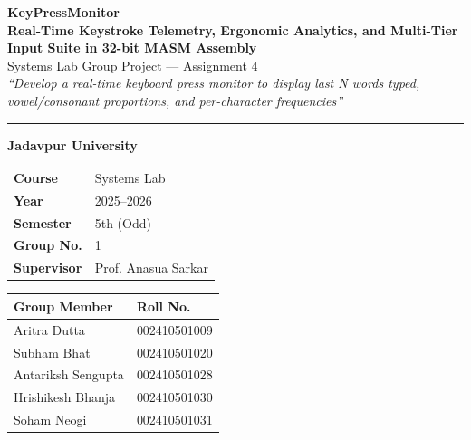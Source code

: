 \documentclass[11pt,a4paper]{article}
\begin{document}

\begin{center}
  {\Huge\textbf{\color{navyBlue}KeyPressMonitor}}\\[0.25em]
  {\Large\textbf{Real-Time Keystroke Telemetry, Ergonomic Analytics, and Multi-Tier Input Suite in 32-bit MASM Assembly}}\\[0.8em]
  {\large Systems Lab Group Project — Assignment 4}\\[0.3em]
  {\small\textit{“Develop a real-time keyboard press monitor to display last N words typed, vowel/consonant proportions, and per-character frequencies”}}
\end{center}

\vspace{0.8em}
\noindent\rule{\textwidth}{1.2pt}
\vspace{0.8em}

\noindent
\begin{minipage}[t]{0.48\textwidth}
  \begin{tcolorbox}[labbox, title=Dept. of Computer Science \& Engineering, colbacktitle=navyBlue]
    \textbf{Jadavpur University}\\[0.5em]
    \begin{tabular}{ll}
      \textbf{Course}     & Systems Lab \\
      \textbf{Year}       & 2025–2026 \\
      \textbf{Semester}   & 5th (Odd) \\
      \textbf{Group No.}  & 1 \\
      \textbf{Supervisor} & Prof. Anasua Sarkar
    \end{tabular}
  \end{tcolorbox}
\end{minipage}
\hfill
\begin{minipage}[t]{0.48\textwidth}
  \begin{tcolorbox}[labbox, title=Group Members \& Roll Numbers, colbacktitle=navyBlue]
    \centering
    \begin{tabular}{ll}
      \toprule
      \textbf{Group Member} & \textbf{Roll No.} \\
      \midrule
      Aritra Dutta       & 002410501009 \\
      Subham Bhat        & 002410501020 \\
      Antariksh Sengupta & 002410501028 \\
      Hrishikesh Bhanja  & 002410501030 \\
      Soham Neogi        & 002410501031 \\
      \bottomrule
    \end{tabular}
  \end{tcolorbox}
\end{minipage}
\end{document}
